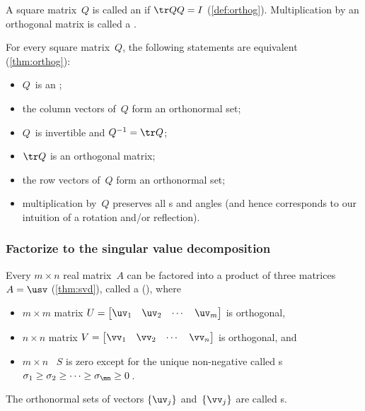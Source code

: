 \begin{itemize}
\itemhi A square matrix~\(Q\) is called an  if \(\tr QQ=I\) (\autoref{def:orthog}).
Multiplication by an orthogonal matrix is called a .

\itemme For every square matrix~\(Q\),  the following statements are equivalent (\autoref{thm:orthog}):
\begin{itemize}
\item \(Q\)~is an ;
\item the {column vector}s of~\(Q\) form an {orthonormal set}; 
\item \(Q\)~is {invertible} and \(Q^{-1}=\tr Q\);
\item \(\tr Q\) is an {orthogonal matrix};
\item the {row vector}s of~\(Q\) form an {orthonormal set};
\item multiplication by~\(Q\) preserves all s and angles (and hence corresponds to our intuition of a {rotation and/or reflection}).
\end{itemize}







\subsubsection{Factorize to the singular value decomposition}

\itemhi Every $m\times n$ real matrix~$A$ can be factored into a product of three matrices \(A=\usv\) (\autoref{thm:svd}),
called a  (\svd), where
\begin{itemize}
		\item $m\times m$ matrix $U=\begin{bmatrix} \uv _1 &\uv_2&\cdots&\uv _m \end{bmatrix}$ is orthogonal, 
		\item $n\times n$ matrix $V=\begin{bmatrix} \vv_1 &\vv_2&\cdots&\vv_n \end{bmatrix}$ is orthogonal, and      
        \item  $m\times n$ ~$S$ is zero except for the unique non-negative  called s
$\sigma_1\geq \sigma_2 \geq \cdots \geq \sigma_{\mn}\geq 0$\,.
\end{itemize}
The orthonormal sets of vectors \(\{\uv_j\}\) and~\(\{\vv_j\}\) are called s.


\end{itemize}
